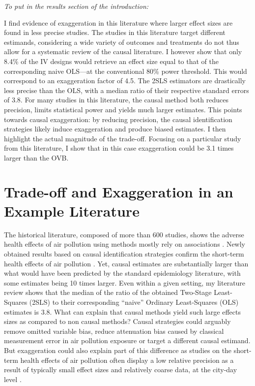\documentclass[usletter, 12pt]{article}
\begin{document}
		\textit{To put in the results section of the introduction:}
		
		I find evidence of exaggeration in this literature where larger effect sizes are found in less precise studies. The studies in this literature target different estimands, considering a wide variety of outcomes and treatments do not thus allow for a systematic review of the causal literature. I however show that only 8.4\% of the IV designs would retrieve an effect size equal to that of the corresponding naive OLS---at the conventional 80\% power threshold. This would correspond to an exaggeration factor of 4.5. The 2SLS estimators are drastically less precise than the OLS, with a median ratio of their respective standard errors of 3.8. For many studies in this literature, the causal method both reduces precision, limits statistical power and yields much larger estimates. This points towards causal exaggeration: by reducing precision, the causal identification strategies likely induce exaggeration and produce biased estimates. I then highlight the actual magnitude of the trade-off. Focusing on a particular study from this literature, I show that in this case exaggeration could be 3.1 times larger than the OVB.
						
		\section{Trade-off and Exaggeration in an Example Literature}
		
		The historical literature, composed of more than 600 studies, shows the adverse health effects of air pollution using methods mostly rely on associations \citep{dominici_best_2017, bind_causal_2019}. Newly obtained results based on causal identification strategies confirm the short-term health effects of air pollution \citep{schwartz_estimating_2015, schwartz_national_2018, deryugina_mortality_2019}. Yet, causal estimates are substantially larger than what would have been predicted by the standard epidemiology literature, with some estimates being 10 times larger. Even within a given setting, my literature review shows that the median of the ratio of the obtained Two-Stage Least-Squares (2SLS) to their corresponding ``naive'' Ordinary Least-Squares (OLS) estimates is 3.8.
		 What can explain that causal methods yield such large effects sizes as compared to non causal methods? Causal strategies could arguably remove omitted variable bias, reduce attenuation bias caused by classical measurement error in air pollution exposure or target a different causal estimand. But exaggeration could also explain part of this difference as studies on the short-term health effects of air pollution often display a low relative precision as a result of typically small effect sizes and relatively coarse data, at the city-day level \citep{peng2006model, peng2008statistical}.
		 
\end{document}
